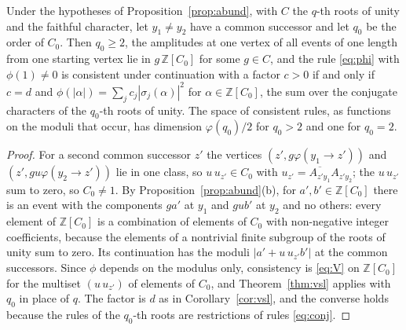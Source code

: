 \begin{corollary}\label{cor:abund}
Under the hypotheses of Proposition~\ref{prop:abund}, with $C$ the $q$-th roots of unity and the faithful character, let $y_1\ne y_2$ have a common successor and let $q_0$ be the order of $C_0$. Then $q_0\ge2$, the amplitudes at one vertex of all events of one length from one starting vertex lie in $g\,\mathbb{Z}[C_0]$ for some $g\in C$, and the rule \eqref{eq:phi} with $\phi(1)\ne0$ is consistent under continuation with a factor $c>0$ if and only if $c=d$ and $\phi(|\alpha|)=\sum_jc_j|\sigma_j(\alpha)|^2$ for $\alpha\in\mathbb{Z}[C_0]$, the sum over the conjugate characters of the $q_0$-th roots of unity. The space of consistent rules, as functions on the moduli that occur, has dimension $\varphi(q_0)/2$ for $q_0>2$ and one for $q_0=2$.
\end{corollary}
\begin{proof}
For a second common successor $z'$ the vertices $(z',g\varphi(y_1\to z'))$ and $(z',gu\varphi(y_2\to z'))$ lie in one class, so $u\,u_{z'}\in C_0$ with $u_{z'}=\overline{A_{z'y_1}}A_{z'y_2}$; the $u\,u_{z'}$ sum to zero, so $C_0\ne1$. By Proposition~\ref{prop:abund}(b), for $a',b'\in\mathbb{Z}[C_0]$ there is an event with the components $ga'$ at $y_1$ and $gub'$ at $y_2$ and no others: every element of $\mathbb{Z}[C_0]$ is a combination of elements of $C_0$ with non-negative integer coefficients, because the elements of a nontrivial finite subgroup of the roots of unity sum to zero. Its continuation has the moduli $|a'+u\,u_{z'}b'|$ at the common successors. Since $\phi$ depends on the modulus only, consistency is \eqref{eq:V} on $\mathbb{Z}[C_0]$ for the multiset $(u\,u_{z'})$ of elements of $C_0$, and Theorem~\ref{thm:vsl} applies with $q_0$ in place of $q$. The factor is $d$ as in Corollary~\ref{cor:vsl}, and the converse holds because the rules of the $q_0$-th roots are restrictions of rules \eqref{eq:conj}.
\end{proof}

